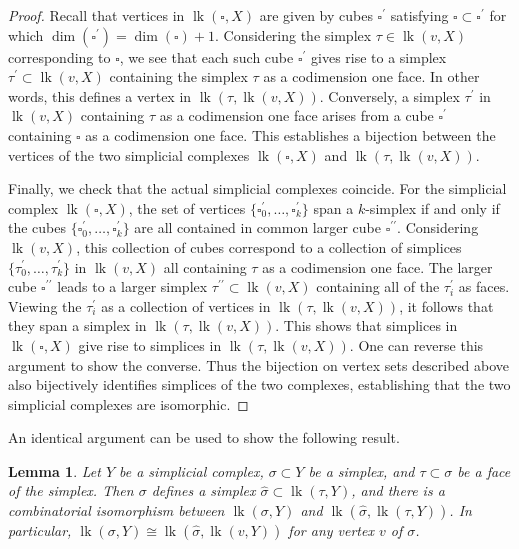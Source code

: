 \documentclass[12pt, letterpaper]{article}
\newcommand{\lk}{\operatorname{lk}}
\theoremstyle{plain}
\newtheorem{lem}[thm]{Lemma}
\theoremstyle{definition}
\begin{document}
\begin{proof}
Recall that vertices in $\lk(\square, X)$ are given by cubes $\square^\prime$ satisfying $\square \subset \square^\prime$ for which $\dim(\square^\prime)=\dim(\square)+1.$ Considering the simplex $\tau \in \lk(v, X)$ corresponding to $\square$, we see that each such cube $\square^\prime$ gives rise to a simplex $\tau^\prime \subset \lk(v,X)$ containing the simplex $\tau$ as a codimension one face. In other words, this defines a vertex in $\lk(\tau, \lk(v, X))$. Conversely, a simplex $\tau^\prime$ in $\lk(v, X)$ containing $\tau$ as a codimension one face arises from a cube $\square^\prime$ containing $\square$ as a codimension one face. This establishes a bijection between the vertices of the two simplicial complexes $\lk(\square, X)$ and $\lk(\tau, \lk(v,X))$.
    
Finally, we check that the actual simplicial complexes coincide. For the simplicial complex $\lk(\square, X)$, the set of vertices $\{\square^\prime_0, \ldots , \square^\prime_k \}$ span a $k$-simplex if and only if the cubes $\{\square^\prime_0, \ldots ,\square^\prime_k\}$ are all contained in common larger cube $\square^{\prime\prime}$. Considering $\lk(v, X)$, this collection of cubes correspond to a collection of simplices $\{\tau^\prime_0, \ldots , \tau^\prime_k \}$ in $\lk(v,X)$ all containing $\tau$ as a codimension one face. The larger cube $\square^{\prime\prime}$ leads to a larger simplex $\tau^{\prime\prime} \subset \lk(v, X)$ containing all of the $\tau^\prime_i$ as faces. Viewing the $\tau^\prime_i$ as a collection of vertices in $\lk(\tau, \lk(v,X))$, it follows that they span a simplex in $\lk(\tau, \lk(v,X))$. This shows that simplices in $\lk(\square, X)$ give rise to simplices in $\lk(\tau, \lk(v,X))$. One can reverse this argument to show the converse. Thus the bijection on vertex sets described above also bijectively identifies simplices of the two complexes, establishing that the two simplicial complexes are isomorphic.
\end{proof}

An identical argument can be used to show the following result.

\begin{lem}\label{lem:links-simpclx-to-vertex}
    Let $Y$ be a simplicial complex, $\sigma \subset Y$ be a simplex, and $\tau \subset \sigma$ be a face of the simplex. Then $\sigma$ defines a simplex $\hat \sigma \subset \lk(\tau, Y)$, and there is a combinatorial isomorphism between $\lk(\sigma, Y)$ and $\lk(\hat \sigma, \lk(\tau, Y))$. In particular, $\lk(\sigma, Y) \cong \lk(\hat \sigma, \lk(v, Y))$ for any vertex $v$ of $\sigma$.
\end{lem}
\end{document}
